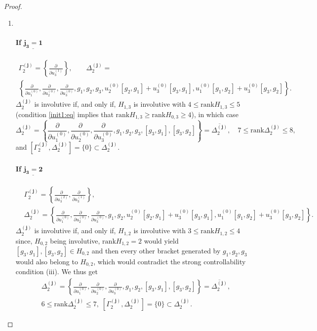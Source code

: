 \documentclass[10pt]{article}
\newcommand{\3}{\mathbf{3}}
\newcommand{\2}{\mathbf{2}}
\newcommand{\1}{\mathbf{1}}
\newcommand{\0}{\mathbf{0}}
\newcommand{\mbf}[1]{\mathbf{#1}}
\newcommand{\rk}{\mathrm{rank}}
\newcommand{\ddu}[2]{\frac{\partial}{\partial u_{#1}^{(#2)}}}
\newcommand{\ol}[1]{\overline{#1}}
\begin{document}
\begin{proof}
\begin{enumerate}
\item[\framebox{\Large{$\mathbf{k=2}$}}]
~
\paragraph{If $\underline{\mathbf{j_{3} =1}}$}

$$\begin{array}{l}
\Gamma_{2}^{(\mbf{j})} = \left\{ \ddu{3}{1} \right\}, \qquad \Delta_{2}^{(\mbf{j})} = \\
\left\{\ddu{1}{0}, \ddu{2}{0}, \ddu{3}{0}, g_{1}, g_{2}, g_{3}, u_{2}^{(0)}[g_{2},g_{1}]+ u_{3}^{(0)}[g_{3},g_{1}], u_{1}^{(0)}[g_{1}, g_{2}] +  u_{3}^{(0)}[g_{3},g_{2}]\right\}. 
\end{array}$$
$\Delta_{2}^{(\mbf{j})}$ is involutive if, and only if, $H_{1,3}$ is involutive with
$4\leq \rk H_{1,3} \leq 5$ (condition \eqref{init1:eq} implies that $\rk H_{1,3} \geq \rk H_{0,3} \geq 4$), in which case
$$\Delta_{2}^{(\mbf{j})} = \left\{\ddu{1}{0}, \ddu{2}{0}, \ddu{3}{0}, g_{1}, g_{2}, g_{3}, [g_{3},g_{1}], [g_{3},g_{2}]\right\} = \ol{\Delta_{2}^{(\mbf{j})} }, \quad 7 \leq \rk \Delta_{2}^{(\mbf{j})} \leq 8,$$
and $[\Gamma_{2}^{(\mbf{j})}, \Delta_{2}^{(\mbf{j})}] = \{ 0 \} \subset \Delta_{2}^{(\mbf{j})}.$
\paragraph{If $\underline{\mathbf{j_{3} =2}}$}
$$\begin{aligned}
&\Gamma_{2}^{(\mbf{j})} = \left\{  \ddu{3}{2}, \ddu{3}{1} \right\}, \\
&\Delta_{2}^{(\mbf{j})} = \left\{\ddu{1}{0}, \ddu{2}{0}, \ddu{3}{0}, g_{1}, g_{2},  u_{2}^{(0)}[g_{2},g_{1}]+ u_{3}^{(0)}[g_{3},g_{1}], u_{1}^{(0)}[g_{1}, g_{2}] +  u_{3}^{(0)}[g_{3},g_{2}]\right\}.
\end{aligned}$$
$\Delta_{2}^{(\mbf{j})}$ is involutive if, and only if, $H_{1,2}$ is involutive with
 $3 \leq \rk H_{1,2} \leq 4$ since, $H_{0,2}$ being involutive, $\rk H_{1,2}=2$ would yield $ [g_{3},g_{1}], [g_{3},g_{2}] \in H_{0,2}$ and then every other bracket generated by $g_{1}, g_{2}, g_{3}$ would also belong to $H_{0,2}$, which would contradict the strong controllability condition (iii).
We thus get
$$\begin{aligned}
&\Delta_{2}^{(\mbf{j})} = \left\{\ddu{1}{0}, \ddu{2}{0}, \ddu{3}{0}, g_{1}, g_{2}, [g_{3},g_{1}], [g_{3},g_{2}]\right\} = \ol{\Delta_{2}^{(\mbf{j})}}, \;\\ &6 \leq \rk \Delta_{2}^{(\mbf{j})} \leq 7,\; [\Gamma_{2}^{(\mbf{j})}, \Delta_{2}^{(\mbf{j})}] = \{ 0 \} \subset \Delta_{2}^{(\mbf{j})}.
\end{aligned}$$

\end{enumerate}
\end{proof}
\end{document}
